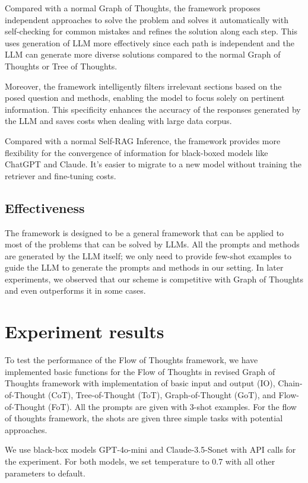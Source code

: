 \documentclass{article}
\begin{document}
Compared with a normal Graph of Thoughts, the framework proposes independent approaches to solve the problem and solves it automatically with self-checking for common mistakes and refines the solution along each step. This uses generation of LLM more effectively since each path is independent and the LLM can generate more diverse solutions compared to the normal Graph of Thoughts or Tree of Thoughts.

Moreover, the framework intelligently filters irrelevant sections based on the posed question and methods, enabling the model to focus solely on pertinent information. This specificity enhances the accuracy of the responses generated by the LLM and saves costs when dealing with large data corpus.

Compared with a normal Self-RAG Inference, the framework provides more flexibility for the convergence of information for black-boxed models like ChatGPT and Claude. It's easier to migrate to a new model without training the retriever and fine-tuning costs.

\subsection{Effectiveness}

The framework is designed to be a general framework that can be applied to most of the problems that can be solved by LLMs. All the prompts and methods are generated by the LLM itself; we only need to provide few-shot examples to guide the LLM to generate the prompts and methods in our setting. In later experiments, we observed that our scheme is competitive with Graph of Thoughts and even outperforms it in some cases.

\section{Experiment results}

To test the performance of the Flow of Thoughts framework, we have implemented basic functions for the Flow of Thoughts in revised Graph of Thoughts framework with implementation of basic input and output (IO), Chain-of-Thought (CoT), Tree-of-Thought (ToT), Graph-of-Thought (GoT), and Flow-of-Thought (FoT). All the prompts are given with 3-shot examples. For the flow of thoughts framework, the shots are given three simple tasks with potential approaches.

We use black-box models GPT-4o-mini and Claude-3.5-Sonet with API calls for the experiment. For both models, we set temperature to 0.7 with all other parameters to default.
\end{document}
